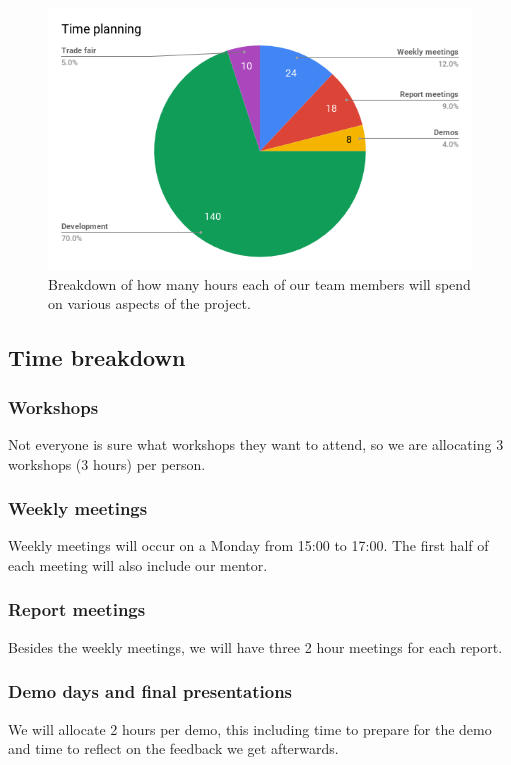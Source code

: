 \documentclass[onecolumn]{IEEEtran}
\begin{document}
\begin{figure}
    \centering
    \includegraphics[width=0.8\linewidth]{time.png}
    \caption{Breakdown of how many hours each of our team members will spend on various aspects of the project.}
\end{figure}

\subsection{Time breakdown}

\subsubsection{Workshops}

Not everyone is sure what workshops they want to attend, so we are allocating 3 workshops (3 hours) per person.

\subsubsection{Weekly meetings}

Weekly meetings will occur on a Monday from 15:00 to 17:00. The first half of each meeting will also include our mentor.

\subsubsection{Report meetings}

Besides the weekly meetings, we will have three 2 hour meetings for each report.

\subsubsection{Demo days and final presentations}

We will allocate 2 hours per demo, this including time to prepare for the demo and time to reflect on the feedback we get afterwards.
\end{document}
